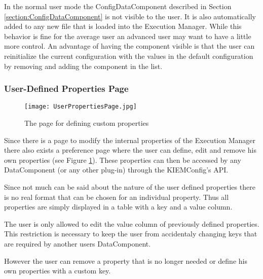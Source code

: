 In the normal user mode the ConfigDataComponent described in Section \ref{section:ConfigDataComponent} is
not visible to the user. It is also automatically added to any new file that is loaded into the Execution Manager.
While this behavior is fine for the average user an advanced user may want to have a little more control. An advantage
of having the component visible is that the user can reinitialize the current configuration with the values in
the default configuration by removing and adding the component in the list.


\subsubsection{User-Defined Properties Page}
\label{section:UserDefinedPropertiesPage}
\begin{figure}[User-Defined Properties Page]
  \centering
  \texttt{[image: UserPropertiesPage.jpg]}
  \caption[The page for defining custom properties]%
  {The page for defining custom properties\protect}
  \label{fig:UserDefinedPropertiesPage}
\end{figure}
Since there is a page to modify the internal properties of the Execution Manager there also exists a
preference page where the user can define, edit and remove his own properties (see Figure \ref{fig:UserDefinedPropertiesPage}). 
These properties can then be accessed by any DataComponent (or any other plug-in) through the \ac{KIEMConfig}'s \ac{API}.

Since not much can be said about the nature of the user defined properties there is no real format that
can be chosen for an individual property. Thus all properties are simply displayed in a table with a 
key and a value column. 

The user is only allowed to edit the value column of previously defined properties. This restriction is
necessary to keep the user from accidentaly changing keys that are required by another users DataComponent.

However the user can remove a property that is no longer needed or define his own properties with a custom key.

